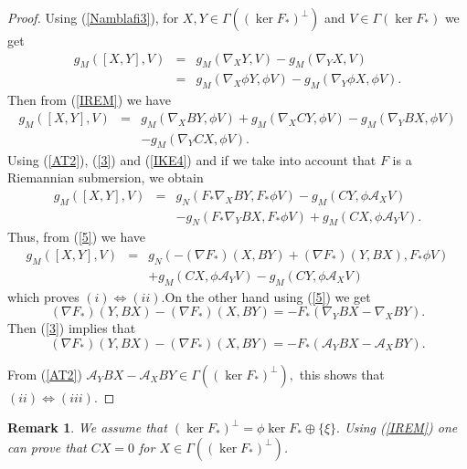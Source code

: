 \documentclass{amsart}
\theoremstyle{plain}
\newtheorem{remark}{Remark}
\numberwithin{equation}{section}
\begin{document}
\begin{proof}
Using (\ref{Namblafi3}), for $X,Y\in \Gamma ((\ker F_{\ast })^{\bot })$ and $V\in \Gamma (\ker F_{\ast })$ we get\begin{eqnarray*}
g_{M}(\left[ X,Y\right] ,V) &=&g_{M}(\nabla _{X}Y,V)-g_{M}(\nabla _{Y}X,V) \\
&=&g_{M}(\nabla _{X}\phi Y,\phi V)-g_{M}(\nabla _{Y}\phi X,\phi V).
\end{eqnarray*}Then from (\ref{IREM}) we have\begin{eqnarray*}
g_{M}(\left[ X,Y\right] ,V) &=&g_{M}(\nabla _{X}BY,\phi V)+g_{M}(\nabla
_{X}CY,\phi V)-g_{M}(\nabla _{Y}BX,\phi V) \\
&&-g_{M}(\nabla _{Y}CX,\phi V).
\end{eqnarray*}Using (\ref{AT2}), (\ref{3}) and (\ref{IKE4}) and if we take into account
that $F$ is a Riemannian submersion, we obtain\begin{eqnarray*}
g_{M}(\left[ X,Y\right] ,V) &=&g_{N}(F_{\ast }\nabla _{X}BY,F_{\ast }\phi
V)-g_{M}(CY,\phi \mathcal{A}_{X}V) \\
&&-g_{N}(F_{\ast }\nabla _{Y}BX,F_{\ast }\phi V)+g_{M}(CX,\phi \mathcal{A}_{Y}V).
\end{eqnarray*}Thus, from (\ref{5}) we have 
\begin{eqnarray*}
g_{M}(\left[ X,Y\right] ,V) &=&g_{N}(-(\nabla F_{\ast })(X,BY)+(\nabla
F_{\ast })(Y,BX),F_{\ast }\phi V) \\
&&+g_{M}(CX,\phi \mathcal{A}_{Y}V)-g_{M}(CY,\phi \mathcal{A}_{X}V)
\end{eqnarray*}which proves $(i)\Leftrightarrow (ii).$On the other hand using (\ref{5}) we
get\begin{equation*}
(\nabla F_{\ast })(Y,BX)-(\nabla F_{\ast })(X,BY)=-F_{\ast }(\nabla
_{Y}BX-\nabla _{X}BY).
\end{equation*}Then (\ref{3}) implies that 
\begin{equation*}
(\nabla F_{\ast })(Y,BX)-(\nabla F_{\ast })(X,BY)=-F_{\ast }(\mathcal{A}_{Y}BX-\mathcal{A}_{X}BY).
\end{equation*}

From (\ref{AT2}) $\mathcal{A}_{Y}BX-\mathcal{A}_{X}BY\in \Gamma ((\ker
F_{\ast })^{\bot }),$ this shows that $(ii)\Leftrightarrow (iii).$
\end{proof}

\begin{remark}
We assume that $(\ker F_{\ast })^{\bot }=\phi \ker F_{\ast }\oplus \{\xi \}.$
Using (\ref{IREM}) one can prove that $CX=0$ \textit{for }$X\in \Gamma
((\ker F_{\ast })^{\bot })$.
\end{remark}
\end{document}

